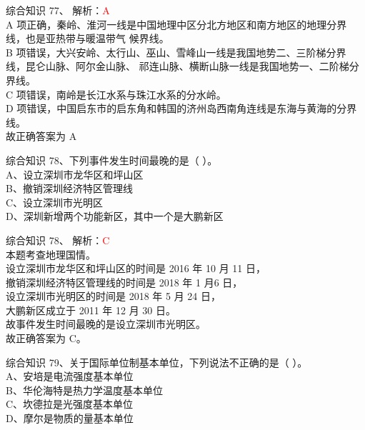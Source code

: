 \documentclass[aspectratio=169]{beamer}
\begin{document}
\begin{frame}[t]{综合知识}
    77、 解析：\textcolor{red}{A}\\
    A 项正确，秦岭、淮河一线是中国地理中区分北方地区和南方地区的地理分界线，也是亚热带与暖温带气
    候界线。\\
    B 项错误，大兴安岭、太行山、巫山、雪峰山一线是我国地势二、三阶梯分界线，昆仑山脉、阿尔金山脉、
    祁连山脉、横断山脉一线是我国地势一、二阶梯分界线。\\
    C 项错误，南岭是长江水系与珠江水系的分水岭。\\
    D 项错误，中国启东市的启东角和韩国的济州岛西南角连线是东海与黄海的分界线。\\
    故正确答案为 A\\
\end{frame}                           





\begin{frame}[t]{综合知识}
    78、下列事件发生时间最晚的是（ ）。             \\
    A、设立深圳市龙华区和坪山区                     \\
    B、撤销深圳经济特区管理线                       \\
    C、设立深圳市光明区                             \\
    D、深圳新增两个功能新区，其中一个是大鹏新区     \\
\end{frame}                           

\begin{frame}[t]{综合知识}
    78、 解析：\textcolor{red}{C}\\
    本题考查地理国情。\\
    设立深圳市龙华区和坪山区的时间是 2016 年 10 月 11 日，\\
    撤销深圳经济特区管理线的时间是 2018 年 1 月6 日，\\
    设立深圳市光明区的时间是 2018 年 5 月 24 日，\\
    大鹏新区成立于 2011 年 12 月 30 日。\\
    故事件发生时间最晚的是设立深圳市光明区。\\
    故正确答案为 C。
\end{frame}                           





\begin{frame}[t]{综合知识} 
    79、关于国际单位制基本单位，下列说法不正确的是（ ）。 \\
    A、安培是电流强度基本单位                             \\
    B、华伦海特是热力学温度基本单位                       \\
    C、坎德拉是光强度基本单位                             \\
    D、摩尔是物质的量基本单位                             \\
\end{frame}                           
\end{document}
